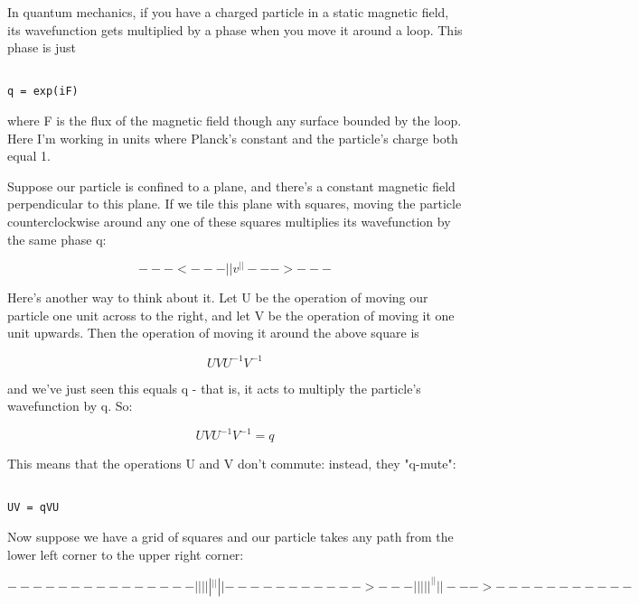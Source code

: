 In quantum mechanics, if you have a charged particle in a static
magnetic field, its wavefunction gets multiplied by a phase when 
you move it around a loop.  This phase is just


\begin{verbatim}

q = exp(iF)
\end{verbatim}
    
where F is the flux of the magnetic field though any surface bounded 
by the loop.  Here I'm working in units where Planck's constant and the 
particle's charge both equal 1.  

Suppose our particle is confined to a plane, and there's a constant
magnetic field perpendicular to this plane.   If we tile this plane 
with squares, moving the particle counterclockwise around any one of 
these squares multiplies its wavefunction by the same phase q:


$$

              ---<---
             |       |
             v       ^
             |       |
              --->---
$$
    
Here's another way to think about it.  Let U be the operation of moving
our particle one unit across to the right, and let V be the operation of
moving it one unit upwards.  Then the operation of moving it around the
above square is


$$

U V U^{-1} V^{-1} 
$$
    
and we've just seen this equals q - that is, it acts to multiply
the particle's wavefunction by q.  So:


$$

U V U^{-1} V^{-1} = q
$$
    
This means that the operations U and V don't commute: instead, 
they "q-mute":


\begin{verbatim}

UV = qVU
\end{verbatim}
    
Now suppose we have a grid of squares and our particle takes any path
from the lower left corner to the upper right corner:


$$

                ---------------
               |       |       |
               |       |       ^
               |       |       |
               |----------->---|
               |       |       |
               |       ^       |
               |       |       | 
                --->-----------
$$
    
